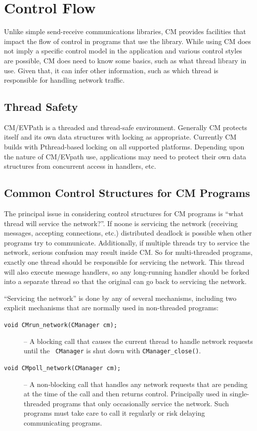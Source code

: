 \documentclass[11pt]{article}
\begin{document}
\section{Control Flow}

\label{sec:controlflow}
Unlike simple send-receive communications libraries, CM provides facilities
that impact the flow of control in programs that use the library.  While
using CM does not imply a specific control model in the application and
various control styles are possible, CM does need to know some basics, such
as what thread library in use.  Given that, it can infer other information,
such as which thread is responsible for handling network traffic.

\subsection{Thread Safety}

CM/EVPath is a threaded and thread-safe environment.  Generally CM protects
itself and its own data structures with locking as appropriate.  Currently
CM builds with Pthread-based locking on all supported platforms.
Depending upon the nature of CM/EVpath use, applications may need to protect
their own data structures from concurrent access in handlers, etc.  

\subsection{Common Control Structures for CM Programs}

The principal issue in considering control structures for CM programs is
``what thread will service the network?''.  If noone is servicing the
network (receiving messages, accepting connections, etc.) distributed
deadlock is possible when other programs try to communicate.  Additionally,
if multiple threads try to service the network, serious confusion may result
inside CM.  So for multi-threaded programs, exactly one thread should be
responsible for servicing the network.  This thread will also execute
message handlers, so any long-running handler should be forked into a
separate thread so that the original can go back to servicing the network.

``Servicing the network'' is done by any of several mechanisms, including
two explicit mechanisms that are normally used in non-threaded programs: 
\begin{description}
\item[{\tt void CMrun\_network(CManager cm);}]  -- A blocking call that
causes the current thread to handle network requests until the {\tt
CManager} is shut down with {\tt CManager\_close()}.  
\item[{\tt void CMpoll\_network(CManager cm);}] -- A non-blocking call that
handles any network requests that are pending at the time of the call and
then returns control.  Principally used in single-threaded programs that
only occasionally service the network.  Such programs must take care to call
it regularly or risk delaying communicating programs.
\end{description}
\end{document}
